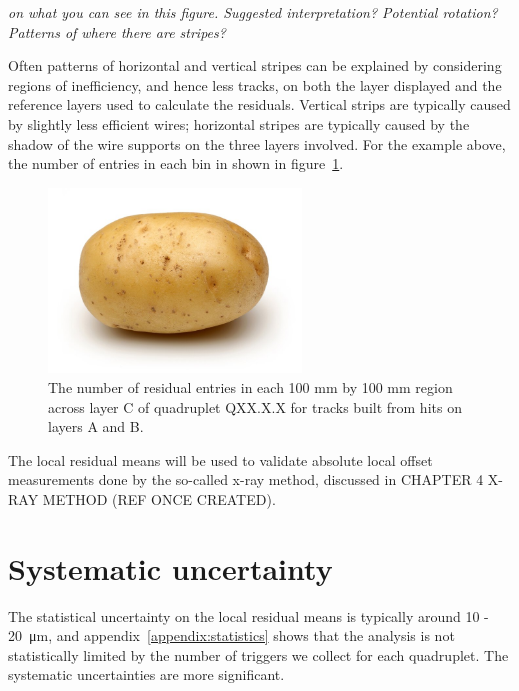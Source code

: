 \textit{on what you can see in this figure. Suggested interpretation? Potential rotation? Patterns of where there are stripes?}

Often patterns of horizontal and vertical stripes can be explained by considering regions of inefficiency, and hence less tracks, on both the layer displayed and the reference layers used to calculate the residuals. Vertical strips are typically caused by slightly less efficient wires; horizontal stripes are typically caused by the shadow of the wire supports on the three layers involved. For the example above, the number of entries in each bin in shown in figure~\ref{fig:num_entries_th2}.

\begin{figure}
    \centering
    \includegraphics[width = 0.6\textwidth]{figures/potato.jpg}
    \caption{The number of residual entries in each 100 mm by 100 mm region across layer C of quadruplet QXX.X.X for tracks built from hits on layers A and B.}
    \label{fig:num_entries_th2}
\end{figure}

The local residual means will be used to validate absolute local offset measurements done by the so-called x-ray method, discussed in CHAPTER 4 X-RAY METHOD (REF ONCE CREATED).

\section{Systematic uncertainty}

The statistical uncertainty on the local residual means is typically around \SI{10}{} - \SI{20}{\micro\meter}, and appendix~\ref{appendix:statistics} shows that the analysis is not statistically limited by the number of triggers we collect for each quadruplet. The systematic uncertainties are more significant. 

